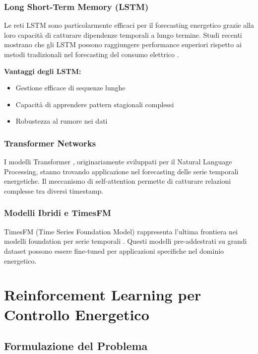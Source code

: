 \documentclass[12pt,a4paper,twoside]{report}
\begin{document}
\subsubsection{Long Short-Term Memory (LSTM)}

Le reti LSTM \cite{hochreiter1997lstm} sono particolarmente efficaci per il forecasting energetico grazie alla loro capacità di catturare dipendenze temporali a lungo termine. Studi recenti mostrano che gli LSTM possono raggiungere performance superiori rispetto ai metodi tradizionali nel forecasting del consumo elettrico \cite{kong2019lstm}.

\textbf{Vantaggi degli LSTM:}
\begin{itemize}
    \item Gestione efficace di sequenze lunghe
    \item Capacità di apprendere pattern stagionali complessi
    \item Robustezza al rumore nei dati
\end{itemize}

\subsubsection{Transformer Networks}

I modelli Transformer \cite{vaswani2017attention}, originariamente sviluppati per il Natural Language Processing, stanno trovando applicazione nel forecasting delle serie temporali energetiche. Il meccanismo di self-attention permette di catturare relazioni complesse tra diversi timestamp.

\subsubsection{Modelli Ibridi e TimesFM}

TimesFM (Time Series Foundation Model) rappresenta l'ultima frontiera nei modelli foundation per serie temporali \cite{das2024timesfm}. Questi modelli pre-addestrati su grandi dataset possono essere fine-tuned per applicazioni specifiche nel dominio energetico.

\section{Reinforcement Learning per Controllo Energetico}

\subsection{Formulazione del Problema}
\end{document}

